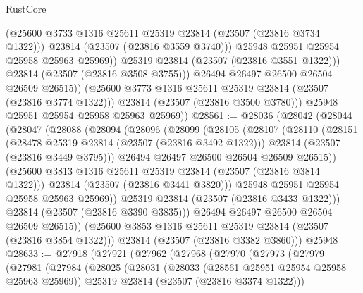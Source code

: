 \begin{lexlean}{RustCore}
\begin{coremodule}
                        (@25600 @3733 @1316 @25611 @25319 @23814 (@23507 (@23816 @3734 @1322)))
                        @23814
                        (@23507 (@23816 @3559 @3740)))
                      @25948
                      @25951
                      @25954
                      @25958
                      @25963
                      @25969))
                  @25319
                  @23814
                  (@23507 (@23816 @3551 @1322)))
                @23814
                (@23507 (@23816 @3508 @3755)))
              @26494
              @26497
              @26500
              @26504
              @26509
              @26515))
          (@25600 @3773 @1316 @25611 @25319 @23814 (@23507 (@23816 @3774 @1322)))
          @23814
          (@23507 (@23816 @3500 @3780)))
        @25948
        @25951
        @25954
        @25958
        @25963
        @25969))
@28561 := @28036
    (@28042
      (@28044
        (@28047
          (@28088
            (@28094
              (@28096
                (@28099
                  (@28105
                    (@28107
                      (@28110
                        (@28151
                          (@28478 @25319 @23814 (@23507 (@23816 @3492 @1322)))
                          @23814
                          (@23507 (@23816 @3449 @3795)))
                        @26494
                        @26497
                        @26500
                        @26504
                        @26509
                        @26515))
                    (@25600 @3813 @1316 @25611 @25319 @23814 (@23507 (@23816 @3814 @1322)))
                    @23814
                    (@23507 (@23816 @3441 @3820)))
                  @25948
                  @25951
                  @25954
                  @25958
                  @25963
                  @25969))
              @25319
              @23814
              (@23507 (@23816 @3433 @1322)))
            @23814
            (@23507 (@23816 @3390 @3835)))
          @26494
          @26497
          @26500
          @26504
          @26509
          @26515))
      (@25600 @3853 @1316 @25611 @25319 @23814 (@23507 (@23816 @3854 @1322)))
      @23814
      (@23507 (@23816 @3382 @3860)))
    @25948
@28633 := @27918
    (@27921
      (@27962
        (@27968
          (@27970
            (@27973
              (@27979
                (@27981
                  (@27984
                    (@28025
                      (@28031
                        (@28033 (@28561 @25951 @25954 @25958 @25963 @25969))
                        @25319
                        @23814
                        (@23507 (@23816 @3374 @1322)))

\end{coremodule}
\end{lexlean}
